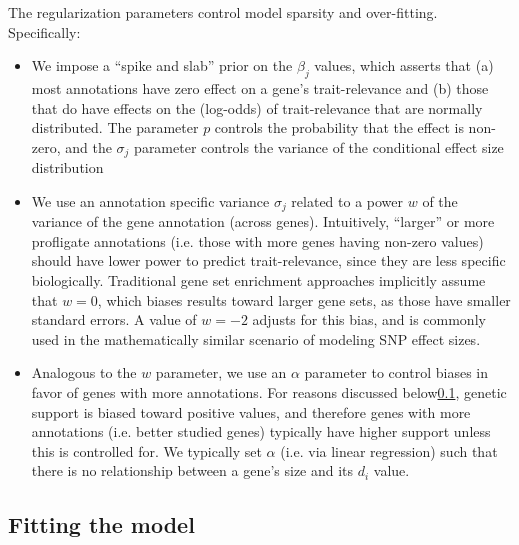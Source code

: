 \documentclass[11pt]{article}
\begin{document}
The regularization parameters control model sparsity and
over-fitting. Specifically:
\begin{itemize}
  \item We impose a ``spike and slab'' prior on the $\beta_j$ values,
    which asserts that (a) most annotations have zero effect on a
    gene's trait-relevance and (b) those that do have effects on the
    (log-odds) of trait-relevance that are normally distributed. The
    parameter $p$ controls the probability that the effect is
    non-zero, and the $\sigma_j$ parameter controls the variance of
    the conditional effect size distribution
  \item We use an annotation specific variance $\sigma_j$ related to
    a power $w$ of the variance of the gene annotation (across
    genes). Intuitively, ``larger'' or more profligate annotations
    (i.e. those with more genes having non-zero values)
    should have lower power to predict trait-relevance, since they are
    less specific biologically. Traditional gene set enrichment approaches
    implicitly assume that $w=0$, which biases results toward larger gene sets,
    as those have smaller standard errors. A value of $w=-2$ adjusts
    for this bias, and is commonly used in the mathematically similar
    scenario of modeling SNP effect sizes\cite{}.
    \item Analogous to the $w$ parameter, we use an $\alpha$ parameter
      to control biases in favor of genes with more annotations. For
      reasons discussed below\ref{}, genetic support is biased toward
      positive values, and therefore genes with more annotations
      (i.e. better studied genes) typically have higher support unless
      this is controlled for. We typically set $\alpha$ (i.e. via
      linear regression)
      such that there is no relationship between a gene's size and its
      $d_i$ value.
\end{itemize}

\subsection{Fitting the model}
\end{document}
